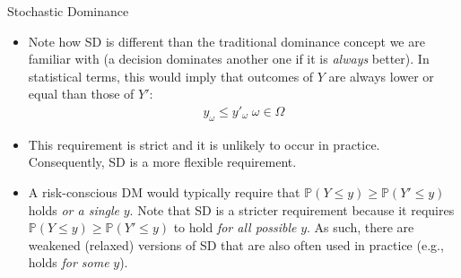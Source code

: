 \documentclass[9pt]{beamer}
\begin{document}
%
\begin{frame}{Stochastic Dominance}

\begin{itemize}

\item Note how SD is different than the traditional dominance concept we are familiar with (a decision dominates another one if it is {\em always} better). In statistical terms, this would imply that outcomes of $Y$ are always lower or equal than those of $Y'$:
\begin{align*}
y_{\omega}\leq y'_\omega\; \omega \in \Omega
\end{align*}
\item This requirement is strict and it is unlikely to occur in practice. Consequently, SD is a more flexible requirement. 
\item A risk-conscious DM would typically require that $\mathbb{P}(Y\leq y)\geq \mathbb{P}(Y'\leq y)$ holds {\em or a single} $y$. Note that SD is a stricter requirement because it requires $\mathbb{P}(Y\leq y)\geq \mathbb{P}(Y'\leq y)$ to hold {\em for all possible} $y$. As such, there are weakened (relaxed) versions of SD that are also often used in practice (e.g., holds {\em for some} $y$).  
\end{itemize}


\end{frame}
\end{document}
